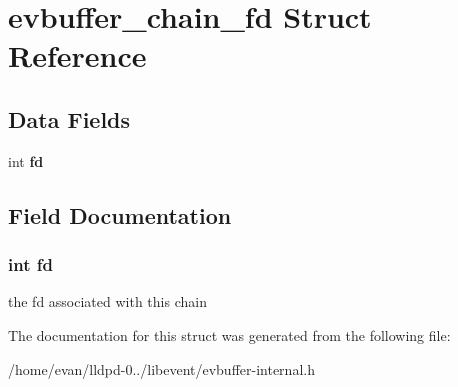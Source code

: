\section{evbuffer\-\_\-chain\-\_\-fd \-Struct \-Reference}
\label{structevbuffer__chain__fd}
\subsection*{\-Data \-Fields}
\begin{DoxyCompactItemize}
\item 
int {\bf fd}
\end{DoxyCompactItemize}


\subsection{\-Field \-Documentation}
\subsubsection[{fd}]{\setlength{\rightskip}{0pt plus 5cm}int {\bf fd}}\label{structevbuffer__chain__fd_a6f8059414f0228f0256115e024eeed4b}
the fd associated with this chain 

\-The documentation for this struct was generated from the following file\-:\begin{DoxyCompactItemize}
\item 
/home/evan/lldpd-\/0../libevent/evbuffer-\/internal.\-h\end{DoxyCompactItemize}
